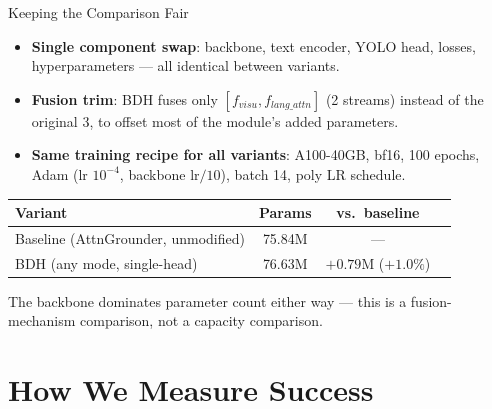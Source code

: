 \documentclass[aspectratio=169]{beamer}
\begin{document}
\begin{frame}{Keeping the Comparison Fair}
  \begin{itemize}
    \item \textbf{Single component swap}: backbone, text encoder, YOLO
      head, losses, hyperparameters — all identical between variants.
    \item \textbf{Fusion trim}: BDH fuses only $[f_{visu}, f_{lang\_attn}]$
      (2 streams) instead of the original 3, to offset most of the
      module's added parameters.
    \item \textbf{Same training recipe for all variants}: A100-40GB,
      bf16, 100 epochs, Adam (lr $10^{-4}$, backbone lr$/10$), batch
      14, poly LR schedule.
  \end{itemize}
  \vspace{0.3cm}
  \begin{table}
    \centering\small
    \begin{tabular}{lccc}
      \toprule
      Variant & Params & vs.\ baseline \\
      \midrule
      Baseline (AttnGrounder, unmodified) & 75.84M & --- \\
      BDH (any mode, single-head) & 76.63M & $+0.79$M ($+1.0\%$) \\
      \bottomrule
    \end{tabular}
  \end{table}
  \small The backbone dominates parameter count either way — this is a
  fusion-mechanism comparison, not a capacity comparison.
\end{frame}

\section{How We Measure Success}
\end{document}
